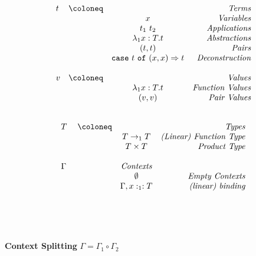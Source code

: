 \begin{minipage}{\textwidth}
  \begin{minipage}{0.45\textwidth}
    \[
      \begin{array}{lccr}
        t & \coloneq & & \emph{Terms}\\
        & & x & \emph{Variables}\\
        && t_1\ t_2 & \emph{Applications}\\
        && \lambda_1 x:T.t & \emph{Abstractions}\\
        && (t, t) & \emph{Pairs}\\
        && \mathtt{case}\ t \ \mathtt{of}\ (x,x) \Rightarrow t & \emph{Deconstruction}\\
        \\
        v & \coloneq & & \emph{Values}\\
        & & \lambda_1 x:T.t & \emph{Function Values}\\
        && (v,v) & \emph{Pair Values}\\
        \\
      \end{array}
    \]
  \end{minipage}
  \hfill
  \begin{minipage}{0.45\textwidth}
    \[
      \begin{array}{lccr}
        T & \coloneq && \emph{Types}\\
        && T\rightarrow_1 T & \emph{(Linear) Function Type}\\
        && T \times T & \emph{Product Type}\\
        \\
        \Gamma & & \emph{Contexts}\\
        & & \emptyset & \emph{Empty Contexts}\\
        & & \Gamma, x :_1 : T &\emph{(linear) binding}\\
        \phantom{\quad}\\
        \phantom{\quad}\\
        \phantom{\quad}\\
        \phantom{\quad}
      \end{array}
    \]
  \end{minipage}
  \hfill
  \vspace{0.5em}
\end{minipage}
\begin{center}{\textbf{Context Splitting}}\quad
$\Gamma = \Gamma_1\circ\Gamma_2$\end{center}
